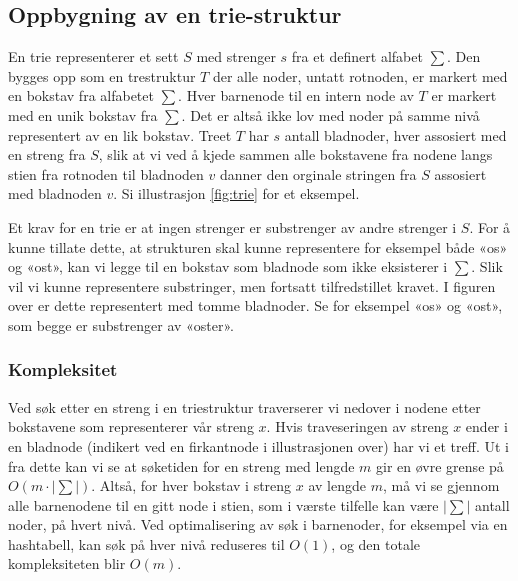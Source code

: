 \subsection{Oppbygning av en trie-struktur}

En trie representerer et sett $S$ med strenger $s$ fra et definert alfabet $\sum$. Den bygges opp som en trestruktur $T$ der alle noder, untatt rotnoden, er markert med en bokstav fra alfabetet $\sum$. Hver barnenode til en intern node av $T$ er markert med en unik bokstav fra $\sum$. Det er altså ikke lov med noder på samme nivå representert av en lik bokstav. Treet $T$ har $s$ antall bladnoder, hver assosiert med en streng fra $S$, slik at vi ved å kjede sammen alle bokstavene fra nodene langs stien fra rotnoden til bladnoden $v$ danner den orginale stringen fra $S$ assosiert med bladnoden $v$. Si illustrasjon \ref{fig:trie} for et eksempel. 

\begin{SCfigure}[H]
\centering

\label{fig:trie}
\caption[Eksempel på triestruktur]{Triestruktur som representerer ordene «and», «ane», «okse», «oktan», «oktav», «os», «ost» og «oster». Bladnoder er indikert ved en firkant.}
\end{SCfigure}

Et krav for en trie er at ingen strenger er substrenger av andre strenger i $S$. For å kunne tillate dette, at strukturen skal kunne representere for eksempel både «os» og «ost», kan vi legge til en bokstav som bladnode som ikke eksisterer i $\sum$. Slik vil vi kunne representere substringer, men fortsatt tilfredstillet kravet. I figuren over er dette representert med tomme bladnoder. Se for eksempel «os» og «ost», som begge er substrenger av «oster».

\subsubsection{Kompleksitet}

Ved søk etter en streng i en triestruktur traverserer vi nedover i nodene etter bokstavene som representerer vår streng $x$. Hvis traveseringen av streng $x$ ender i en bladnode (indikert ved en firkantnode i illustrasjonen over) har vi et treff. Ut i fra dette kan vi se at søketiden for en streng med lengde $m$ gir en øvre grense på $O(m\cdot |\sum|)$. Altså, for hver bokstav i streng $x$ av lengde $m$, må vi se gjennom alle barnenodene til en gitt node i stien, som i værste tilfelle kan være $|\sum|$ antall noder, på hvert nivå. Ved optimalisering av søk i barnenoder, for eksempel via en hashtabell, kan søk på hver nivå reduseres til $O(1)$, og den totale kompleksiteten blir $O(m)$. 

